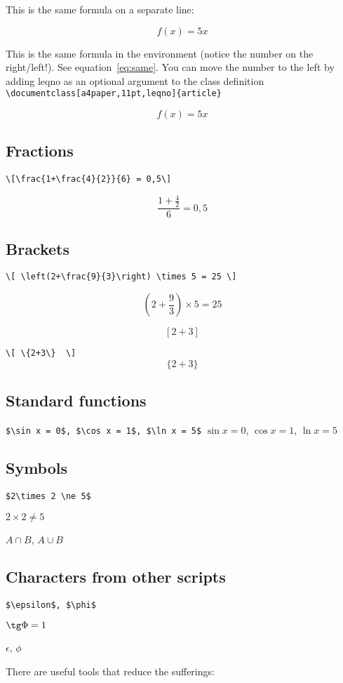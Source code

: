 \documentclass[a4paper,11pt,leqno]{article}
\begin{document}
This is the same formula on a separate line:

\[ f(x)=5x \]

This is the same formula in the environment (notice the number on the right/left!). See equation~\ref{eq:same}. You can move the number to the left by adding leqno as an optional argument to the class definition \verb|\documentclass[a4paper,11pt,leqno]{article}| 

\begin{equation}\label{eq:same}
f(x)=5x
\end{equation}

\subsection{Fractions}
\verb|\[\frac{1+\frac{4}{2}}{6} = 0,5\]|

\[\frac{1+\frac{4}{2}}{6} = 0,5\]

\subsection{Brackets}
\verb|\[ \left(2+\frac{9}{3}\right) \times 5 = 25 \]|

\[ \left(2+\frac{9}{3}\right) \times 5 = 25 \]

\[  [2+3]  \]

\verb|\[ \{2+3\}  \]|
\[ \{2+3\}  \]

\subsection{Standard functions}
\verb|$\sin x = 0$, $\cos x = 1$, $\ln x = 5$|
$\sin x = 0$, $\cos x = 1$, $\ln x = 5$

\subsection{Symbols}
\verb|$2\times 2 \ne 5$|

$2\times 2 \ne 5$

$A \cap B$, $A \cup B$

\subsection{Characters from other scripts}
\verb|$\epsilon$, $\phi$|

$\tg \Phi = 1$

$\epsilon$, $\phi$

\bigskip

There are useful tools that reduce the sufferings:
\end{document}
